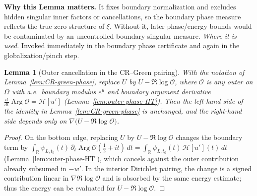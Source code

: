 \documentclass[11pt]{article}
\newcommand{\Hilb}{\mathcal H}
\newtheorem{lemma}{Lemma}[section]
\theoremstyle{definition}
\theoremstyle{remark}
\DeclareMathOperator{\Arg}{Arg}
\begin{document}
\vspace{1.0cm}
\noindent\textbf{Why this Lemma matters.} It fixes boundary normalization and excludes hidden singular inner factors or cancellations, so the boundary phase measure reflects the true zero structure of $\xi$. Without it, later phase/energy bounds would be contaminated by an uncontrolled boundary singular measure.
\noindent\textit{Where it is used.} Invoked immediately in the boundary phase certificate and again in the globalization/pinch step.
\begin{lemma}[Outer cancellation in the CR--Green pairing]
\label{lem:outer-cancel}
With the notation of Lemma~\ref{lem:CR-green-phase}, replace $U$ by $U-\Re\log\mathcal O$, where $\mathcal O$ is any outer on $\Omega$ with a.e.\ boundary modulus $e^{u}$ and boundary argument derivative $\frac{d}{dt}\Arg\mathcal O=\Hilb[u']$ (Lemma~\ref{lem:outer-phase-HT}). Then the left-hand side of the identity in Lemma~\ref{lem:CR-green-phase} is unchanged, and the right-hand side depends only on $\nabla\!\big(U-\Re\log\mathcal O\big)$.
\end{lemma}
\begin{proof}
On the bottom edge, replacing $U$ by $U-\Re\log\mathcal O$ changes the boundary term by
$\int_{\mathbb R}\psi_{L,t_0}(t)\,\partial_t\Arg\mathcal O(\tfrac12+it)\,dt
=\int_{\mathbb R}\psi_{L,t_0}(t)\,\Hilb[u'](t)\,dt$
(Lemma~\ref{lem:outer-phase-HT}), which cancels against the outer contribution already subsumed in $-w'$. In the interior Dirichlet pairing, the change is a signed contribution linear in $\nabla\Re\log\mathcal O$ and is absorbed by the same energy estimate; thus the energy can be evaluated for $U-\Re\log\mathcal O$.
\end{proof}
\end{document}
